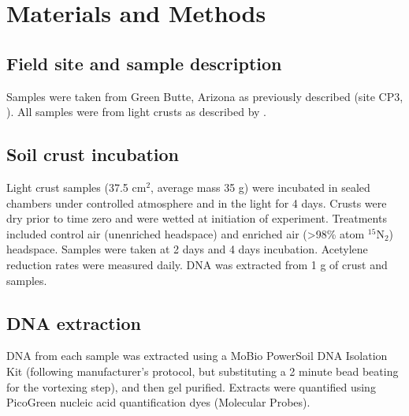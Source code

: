 \section{Materials and Methods}
\subsection{Field site and sample description}
Samples were taken from Green Butte, Arizona as previously described (site CP3,
\citet{BERALDI_CAMPESI_2009}). All samples were from light crusts as described
by \cite{15643930}.

\subsection{Soil crust incubation}
Light crust samples (37.5 cm$^{2}$, average mass 35 g) were incubated in sealed
chambers under controlled atmosphere and in the light for 4 days. Crusts were
dry prior to time zero and were wetted at initiation of experiment. Treatments
included control air (unenriched headspace) and enriched air (\textgreater98\%
atom $^{15}$N$_{2}$) headspace. Samples were taken at 2 days and 4 days
incubation.  Acetylene reduction rates were measured daily. DNA was extracted
from 1 g of crust and samples.

\subsection{DNA extraction}
DNA from each sample was extracted using a MoBio PowerSoil DNA Isolation Kit (following manufacturer’s protocol, but substituting a 2 minute bead beating for the vortexing step), and then gel purified. Extracts were quantified using PicoGreen nucleic acid quantification dyes (Molecular Probes). 
